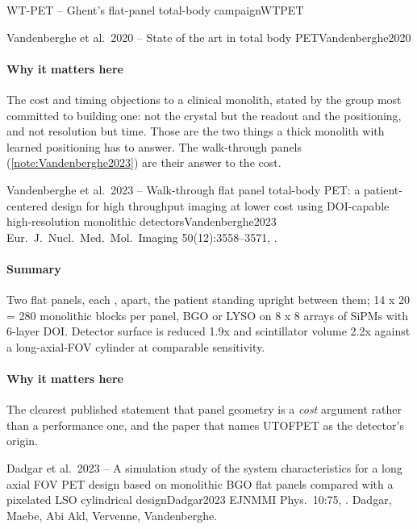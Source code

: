 \begin{programnote}{WT-PET -- Ghent's flat-panel total-body campaign}{WTPET}
\begin{papernote}{Vandenberghe et al.\ 2020 -- State of the art in total body PET}{Vandenberghe2020}
\paragraph{Why it matters here}
The cost and timing objections to a clinical monolith, stated by the group
most committed to building one: not the crystal but the readout and the
positioning, and not resolution but time. Those are the two things a thick
monolith with learned positioning has to answer. The walk-through panels
(\ref{note:Vandenberghe2023}) are their answer to the cost.

\end{papernote}

\begin{papernote}{Vandenberghe et al.\ 2023 -- Walk-through flat panel total-body PET: a patient-centered design for high throughput imaging at lower cost using DOI-capable high-resolution monolithic detectors}{Vandenberghe2023}
Eur.\ J.\ Nucl.\ Med.\ Mol.\ Imaging 50(12):3558--3571,
.

\paragraph{Summary}
Two flat panels, each ,  apart,
the patient standing upright between them; 14 x 20 = 280 monolithic blocks
per panel,  BGO or LYSO on 8 x 8
arrays of  SiPMs with 6-layer DOI. Detector
surface is reduced 1.9x and scintillator volume 2.2x against a long-axial-FOV
cylinder at comparable sensitivity. 

\paragraph{Why it matters here}
The clearest published statement that panel geometry is a \emph{cost}
argument rather than a performance one, and the paper that names UTOFPET as
the detector's origin.

\end{papernote}

\begin{papernote}{Dadgar et al.\ 2023 -- A simulation study of the system characteristics for a long axial FOV PET design based on monolithic BGO flat panels compared with a pixelated LSO cylindrical design}{Dadgar2023}
EJNMMI Phys.\ 10:75, . Dadgar, Maebe, Abi Akl,
Vervenne, Vandenberghe.


\end{papernote}
\end{programnote}
